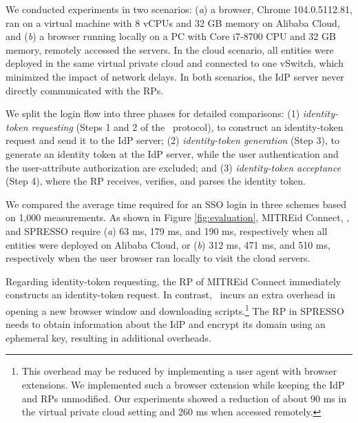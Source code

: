 We conducted experiments in two scenarios: (\emph{a}) a browser, Chrome 104.0.5112.81, ran on a virtual machine with 8 vCPUs and 32 GB memory on Alibaba Cloud, and (\emph{b}) a browser running locally on a PC with Core i7-8700 CPU and 32 GB memory, remotely accessed the servers.
In the cloud scenario, all entities were deployed in the same virtual private cloud and connected to one vSwitch, which minimized the impact of network delays. In both scenarios, the IdP server never directly communicated with the RPs.

 We split the login flow into three phases for detailed comparisons: (1)
{\em identity-token requesting} (Steps 1 and 2 of the \usso~protocol), to construct an identity-token request and send it to the IdP server; (2) {\em identity-token generation} (Step 3), to generate an identity token at the IdP server, while the user authentication and the user-attribute authorization are excluded; and (3) {\em identity-token acceptance} (Step 4), where the RP receives, verifies, and parses the identity token.


We compared the average time required for an SSO login in three schemes based on 1,000 measurements. As shown in Figure \ref{fig:evaluation},
MITREid Connect, \usso, and SPRESSO require (\emph{a}) 63 ms, 179 ms, and 190 ms, respectively when all entities were deployed on Alibaba Cloud,
 or (\emph{b}) 312 ms, 471 ms, and 510 ms, respectively when the user browser ran locally to visit the cloud servers.

Regarding identity-token requesting, %
the RP of MITREid Connect immediately constructs an identity-token request. %
In contrast, \usso~incurs an extra overhead in opening a new browser window and downloading scripts.\footnote{This overhead may be reduced %
by implementing a user agent with browser extensions.
We implemented such a browser extension while keeping the IdP and RPs unmodified. Our experiments showed a reduction of about 90 ms in the virtual private cloud setting and 260 ms when accessed remotely.}
The RP in SPRESSO needs to obtain information about the IdP %
and encrypt its domain using an ephemeral key, resulting in additional overheads.

